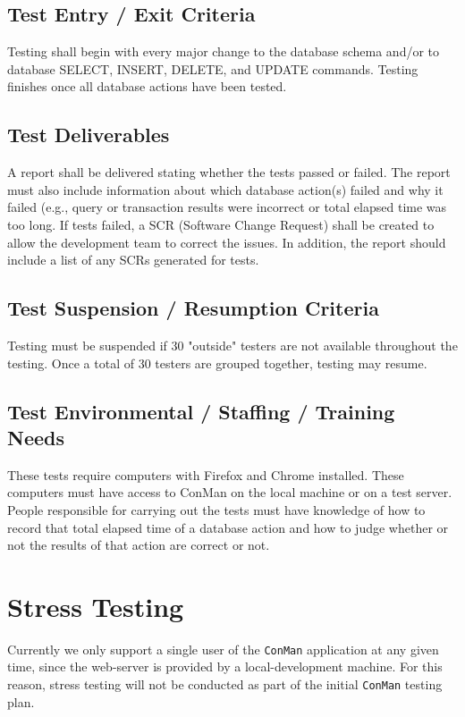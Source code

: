 \documentclass{article}
\begin{document}
\subsection{Test Entry / Exit Criteria}
Testing shall begin with every major change to the database schema and/or to database SELECT, 
INSERT, DELETE, and UPDATE commands. Testing finishes once all database actions have been 
tested. 

\subsection{Test Deliverables}
A report shall be delivered stating whether the tests passed or failed. The report 
must also include information about which database action(s) failed and why it failed (e.g., 
query or transaction results were incorrect or total elapsed time was too long. If tests 
failed, a SCR (Software Change Request) shall be created to allow the development 
team to correct the issues. In addition, the report should include a list of any 
SCRs generated for tests.

\subsection{Test Suspension / Resumption Criteria}
Testing must be suspended if 30 "outside" testers are not available throughout the 
testing. Once a total of 30 testers are grouped together, testing may resume.

\subsection{Test Environmental / Staffing / Training Needs}
These tests require computers with Firefox and Chrome installed. These computers must
have access to ConMan on the local machine or on a test server. People responsible for
carrying out the tests must have knowledge of how to record that total elapsed time 
of a database action and how to judge whether or not the results of that action are 
correct or not.

\newpage
\section{Stress Testing}
Currently we only support a single user of the \texttt{ConMan} application at any given time, since the web-server is provided by a local-development machine.
For this reason, stress testing will not be conducted as part of the initial \texttt{ConMan} testing plan.
\end{document}
